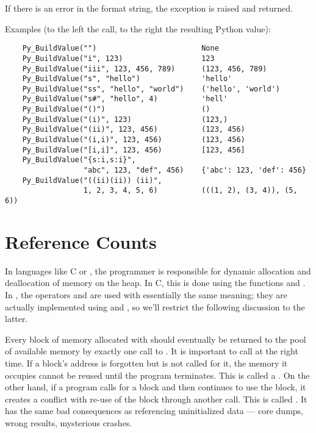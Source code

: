 \documentclass{manual}
\begin{document}
If there is an error in the format string, the
 exception is raised and \NULL{} returned.

Examples (to the left the call, to the right the resulting Python value):

\begin{verbatim}
    Py_BuildValue("")                        None
    Py_BuildValue("i", 123)                  123
    Py_BuildValue("iii", 123, 456, 789)      (123, 456, 789)
    Py_BuildValue("s", "hello")              'hello'
    Py_BuildValue("ss", "hello", "world")    ('hello', 'world')
    Py_BuildValue("s#", "hello", 4)          'hell'
    Py_BuildValue("()")                      ()
    Py_BuildValue("(i)", 123)                (123,)
    Py_BuildValue("(ii)", 123, 456)          (123, 456)
    Py_BuildValue("(i,i)", 123, 456)         (123, 456)
    Py_BuildValue("[i,i]", 123, 456)         [123, 456]
    Py_BuildValue("{s:i,s:i}",
                  "abc", 123, "def", 456)    {'abc': 123, 'def': 456}
    Py_BuildValue("((ii)(ii)) (ii)",
                  1, 2, 3, 4, 5, 6)          (((1, 2), (3, 4)), (5, 6))
\end{verbatim}


\section{Reference Counts
         \label{refcounts}}

In languages like C or \Cpp{}, the programmer is responsible for
dynamic allocation and deallocation of memory on the heap.  In C,
this is done using the functions  and
.  In \Cpp{}, the operators  and
 are used with essentially the same meaning; they are
actually implemented using  and
, so we'll restrict the following discussion to the
latter.

Every block of memory allocated with  should
eventually be returned to the pool of available memory by exactly one
call to .  It is important to call
 at the right time.  If a block's address is
forgotten but  is not called for it, the memory it
occupies cannot be reused until the program terminates.  This is
called a .  On the other hand, if a program calls
 for a block and then continues to use the block, it
creates a conflict with re-use of the block through another
 call.  This is called .
It has the same bad consequences as referencing uninitialized data ---
core dumps, wrong results, mysterious crashes.
\end{document}
